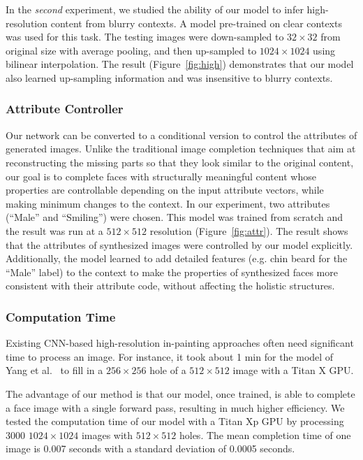 \documentclass[acmtog,timestamp]{acmart}
\begin{document}
In the \textit{second} experiment, we studied the ability of our model to infer high-resolution content from blurry contexts. A model pre-trained on clear contexts was used for this task. The testing images were down-sampled to $32\times32$ from original size with average pooling, and then up-sampled to $1024\times1024$ using bilinear interpolation. The result (Figure~\ref{fig:high}) demonstrates that our model also learned up-sampling information and was insensitive to blurry contexts.

\subsubsection{Attribute Controller}
Our network can be converted to a conditional version to control the attributes of generated images. Unlike the traditional image completion techniques that aim at reconstructing the missing parts so that they look similar to the original content, our goal is to complete faces with structurally meaningful content whose properties are controllable depending on the input attribute vectors, while making minimum changes to the context. In our experiment, two attributes (``Male'' and ``Smiling'') were chosen. This model was trained from scratch and the result was run at a $512\times512$ resolution (Figure~\ref{fig:attr}). The result shows that the attributes of synthesized images were controlled by our model explicitly. Additionally, the model learned to add detailed features (e.g. chin beard for the ``Male'' label) to the context to make the properties of synthesized faces more consistent with their attribute code, without affecting the holistic structures.

\subsubsection{Computation Time}
Existing CNN-based high-resolution in-painting approaches often need significant time to process an image. For instance, it took about 1 min for the model of Yang et al.~\cite{yang2016high} to fill in a $256\times256$ hole of a $512\times512$ image with a Titan X GPU. 

The advantage of our method is that our model, once trained, is able to complete a face image with a single forward pass, resulting in much higher efficiency. We tested the computation time of our model with a Titan Xp GPU by processing 3000 $1024\times1024$ images with $512\times512$ holes. The mean completion time of one image is 0.007 seconds with a standard deviation of 0.0005 seconds.
\end{document}
